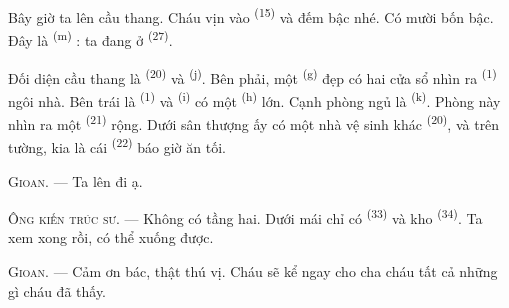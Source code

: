 Bây giờ ta lên cầu thang. Cháu vịn vào  \textsuperscript{(15)} và đếm
bậc nhé. Có mười bốn bậc. Đây là  \textsuperscript{(m)} : ta đang ở
 \textsuperscript{(27)}.

\VUsaut{3.0mm}
\VUsaut{3.0mm}

Đối diện cầu thang là  \textsuperscript{(20)} và  \textsuperscript{(j)}. Bên phải, một  \textsuperscript{(g)} đẹp
có hai cửa sổ nhìn ra  \textsuperscript{(1)} ngôi nhà. Bên trái là
 \textsuperscript{(1)} và 
\textsuperscript{(i)} có một  \textsuperscript{(h)} lớn. Cạnh phòng
ngủ là  \textsuperscript{(k)}. Phòng này nhìn ra một
 \textsuperscript{(21)} rộng. Dưới sân thượng ấy có một nhà vệ sinh
khác \textsuperscript{(20)}, và trên tường, kia là cái 
\textsuperscript{(22)} báo giờ ăn tối.

\textsc{Gioan}. --- Ta lên  đi ạ.

\textsc{Ông kiến trúc sư}. --- Không có tầng hai. Dưới mái chỉ có 
\textsuperscript{(33)} và kho \textsuperscript{(34)}. Ta xem xong rồi, có thể xuống được.

\textsc{Gioan}. --- Cảm ơn bác, thật thú vị. Cháu sẽ kể ngay cho cha cháu tất cả những
gì cháu đã thấy.
\VUsaut{4.0mm}
\VUfilet{22mm}
